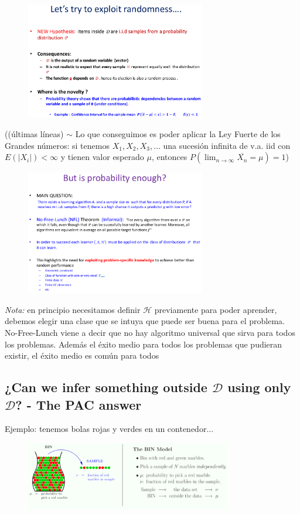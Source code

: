 \documentclass[11pt,a4paper]{article}
\theoremstyle{definition}
\begin{document}
	\begin{figure}[H]
		\centering
		\includegraphics[width=0.7\textwidth]{images/randomness}
	\end{figure}
	((últimas líneas) $\sim$ Lo que conseguimos es poder aplicar la Ley Fuerte de los Grandes números: si tenemos $X_1,X_2,X_3,\ldots$ una sucesión infinita de v.a. iid con $E(|X_i|)<\infty$ y tienen valor esperado $\mu$, entonces $P(\lim_{n\to \infty} \overline{X_n} = \mu ) =1$)
	
	\begin{figure}[H]
		\centering
		\includegraphics[width=0.7\textwidth]{images/prob_not_enough}
	\end{figure}
	\textit{Nota:} en principio necesitamos definir $\mathcal{H}$ previamente para poder aprender, debemos elegir una clase que se intuya que puede ser buena para el problema. No-Free-Lunch viene a decir que no hay algoritmo universal que sirva para todos los problemas. Además el éxito medio para todos los problemas que pudieran existir, el éxito medio es común para todos
	
	
	\subsection{¿Can we infer something outside $\mathcal{D}$ using only $\mathcal{D}$? - The PAC answer}
	Ejemplo: tenemos bolas rojas y verdes en un contenedor...
	\begin{figure}[H]
		\centering
		\includegraphics[width=0.8\textwidth]{images/marbles}
	\end{figure}
	
\end{document}
